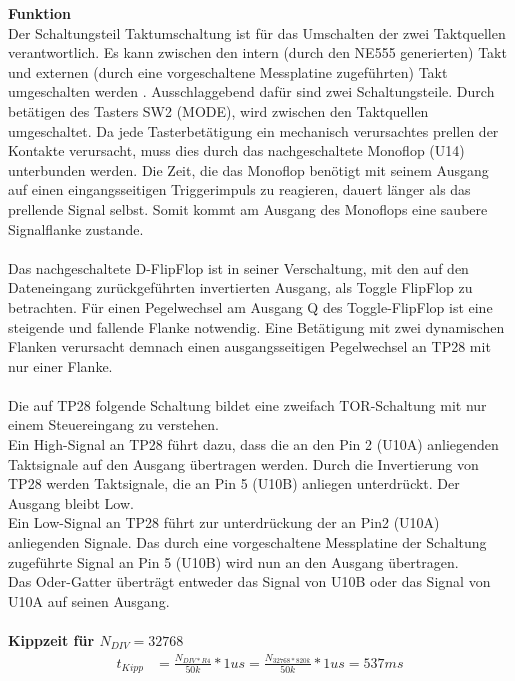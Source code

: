 \documentclass[a4paper,11pt]{scrartcl}
\begin{document}
\textbf{Funktion}
\\
Der Schaltungsteil \glqq Taktumschaltung \grqq{} ist für das Umschalten der zwei Taktquellen verantwortlich. Es kann zwischen den intern (durch den NE555 generierten) Takt und externen (durch eine vorgeschaltene Messplatine zugeführten) Takt umgeschalten werden . Ausschlaggebend dafür sind zwei Schaltungsteile. Durch betätigen des Tasters SW2 (MODE), wird zwischen den Taktquellen umgeschaltet. Da jede Tasterbetätigung ein mechanisch verursachtes prellen der Kontakte verursacht, muss dies durch das nachgeschaltete  Monoflop (U14) unterbunden werden. Die Zeit, die das Monoflop benötigt mit seinem Ausgang auf einen eingangsseitigen Triggerimpuls zu reagieren, dauert länger als das prellende Signal selbst. Somit kommt am Ausgang des Monoflops eine saubere Signalflanke zustande. 
\\
\\
Das nachgeschaltete D-FlipFlop ist in seiner Verschaltung, mit den auf den Dateneingang zurückgeführten invertierten Ausgang, als Toggle FlipFlop zu betrachten. Für einen Pegelwechsel am Ausgang Q des Toggle-FlipFlop ist eine steigende und fallende Flanke notwendig. Eine Betätigung mit zwei dynamischen Flanken verursacht demnach einen ausgangsseitigen Pegelwechsel an TP28 mit nur einer Flanke. 
\\
\\
Die auf TP28 folgende Schaltung bildet eine zweifach TOR-Schaltung mit nur einem Steuereingang zu verstehen.
\\
Ein High-Signal an TP28 führt dazu, dass die an den Pin 2 (U10A) anliegenden Taktsignale auf den Ausgang übertragen werden. Durch die Invertierung von TP28 werden Taktsignale, die an Pin 5 (U10B) anliegen unterdrückt. Der Ausgang bleibt Low.
\\
Ein Low-Signal an TP28 führt zur unterdrückung der an Pin2 (U10A) anliegenden Signale. Das durch eine vorgeschaltene Messplatine der Schaltung zugeführte Signal an Pin 5 (U10B) wird nun an den Ausgang übertragen.
\\
Das Oder-Gatter überträgt entweder das Signal von U10B oder das Signal von U10A auf seinen Ausgang. 
\\
\\
\textbf{Kippzeit für $N_{DIV} = 32 768$}
\\
\begin{align}
	t_{Kipp} &= \frac{N_{DIV * R4}}{50k} * 1us = \frac{N_{32768 * 820k}}{50k} * 1us = 537ms
\end{align}
\end{document}
